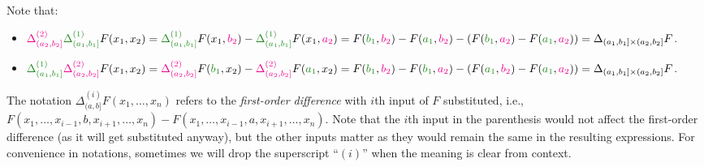 \begin{enumerate}
\begin{itemize}
\begin{itemize}
Note that:
\begin{itemize}
\item \(\mgc{\Delta_{(a_2,b_2]}^{(2)}}\gc{\Delta_{(a_1,b_1]}^{(1)}}F(x_1,x_2)
=\gc{\Delta_{(a_1,b_1]}^{(1)}}F(x_1,\mgc{b_2})-\gc{\Delta_{(a_1,b_1]}^{(1)}}F(x_1,\mgc{a_2})
=F(\gc{b_1},\mgc{b_2})-F(\gc{a_1},\mgc{b_2})
-(F(\gc{b_1},\mgc{a_2})-F(\gc{a_1},\mgc{a_2}))
=\Delta_{(a_1,b_1]\times (a_2,b_2]}F\).
\item \(\gc{\Delta_{(a_1,b_1]}^{(1)}}\mgc{\Delta_{(a_2,b_2]}^{(2)}}F(x_1,x_2)
=\mgc{\Delta_{(a_2,b_2]}^{(2)}}F(\gc{b_1},x_2)-\mgc{\Delta_{(a_2,b_2]}^{(2)}}F(\gc{a_1},x_2)
=F(\gc{b_1},\mgc{b_2})-F(\gc{b_1},\mgc{a_2})
-(F(\gc{a_1},\mgc{b_2})-F(\gc{a_1},\mgc{a_2}))
=\Delta_{(a_1,b_1]\times (a_2,b_2]}F\).
\end{itemize}
\begin{note}
The notation \(\Delta_{(a,b]}^{(i)}F(x_1,\dotsc,x_n)\) refers to the
\emph{first-order difference} with \(i\)th input of \(F\) substituted, i.e.,
\(F(x_1,\dotsc,x_{i-1},b,x_{i+1},\dotsc,x_n)-F(x_1,\dotsc,x_{i-1},a,x_{i+1},\dotsc,x_n)\).
Note that the \(i\)th input in the parenthesis would not affect the first-order
difference (as it will get substituted anyway), but the other inputs matter as
they would remain the same in the resulting expressions. For convenience in
notations, sometimes we will drop the superscript ``\((i)\)'' when the meaning
is clear from context.
\end{note}
\end{itemize}
\end{itemize}


\end{enumerate}
